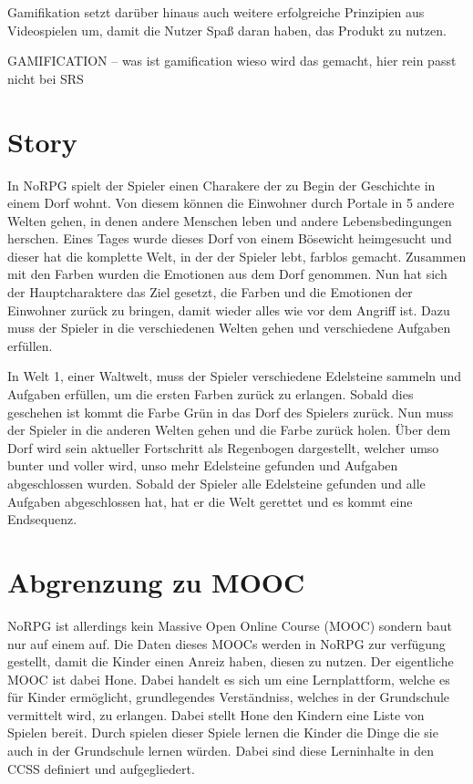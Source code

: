 Gamifikation setzt darüber hinaus auch weitere erfolgreiche Prinzipien aus Videospielen um, damit die Nutzer Spaß daran haben, das Produkt zu nutzen.

	GAMIFICATION -- was ist gamification wieso wird das gemacht, hier rein passt nicht bei SRS
	
\section{Story}

In NoRPG spielt der Spieler einen Charakere der zu Begin der Geschichte in einem Dorf wohnt. Von diesem können die Einwohner durch Portale in 5 andere Welten gehen, in denen andere Menschen leben und andere Lebensbedingungen herschen. Eines Tages wurde dieses Dorf von einem Bösewicht heimgesucht und dieser hat die komplette Welt, in der der Spieler lebt, farblos gemacht. Zusammen mit den Farben wurden die Emotionen aus dem Dorf genommen. Nun hat sich der Hauptcharaktere das Ziel gesetzt, die Farben und die Emotionen der Einwohner zurück zu bringen, damit wieder alles wie vor dem Angriff ist. Dazu muss der Spieler in die verschiedenen Welten gehen und verschiedene Aufgaben erfüllen.

In Welt 1, einer Waltwelt, muss der Spieler verschiedene Edelsteine sammeln und Aufgaben erfüllen, um die ersten Farben zurück zu erlangen. Sobald dies geschehen ist kommt die Farbe Grün in das Dorf des Spielers zurück. Nun muss der Spieler in die anderen Welten gehen und die Farbe zurück holen. Über dem Dorf wird sein aktueller Fortschritt als Regenbogen dargestellt, welcher umso bunter und voller wird, unso mehr Edelsteine gefunden und Aufgaben abgeschlossen wurden. Sobald der Spieler alle Edelsteine gefunden und alle Aufgaben abgeschlossen hat, hat er die Welt gerettet und es kommt eine Endsequenz.
	
\section{Abgrenzung zu MOOC}

NoRPG ist allerdings kein Massive Open Online Course (MOOC) sondern baut nur auf einem auf. Die Daten dieses MOOCs werden in NoRPG zur verfügung gestellt, damit die Kinder einen Anreiz haben, diesen zu nutzen. Der eigentliche MOOC ist dabei Hone. Dabei handelt es sich um eine Lernplattform, welche es für Kinder ermöglicht, grundlegendes Verständniss, welches in der Grundschule vermittelt wird, zu erlangen. Dabei stellt Hone den Kindern eine Liste von Spielen bereit. Durch spielen dieser Spiele lernen die Kinder die Dinge die sie auch in der Grundschule lernen würden. Dabei sind diese Lerninhalte in den CCSS definiert und aufgegliedert.